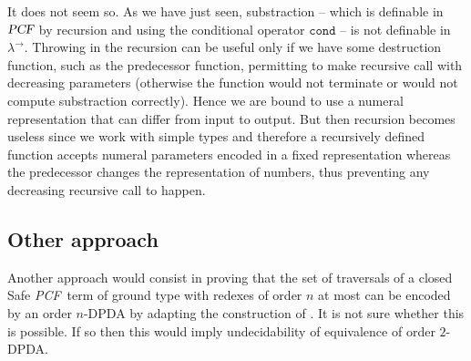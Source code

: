 \documentclass{article}
\newcommand\nat{\mathbb{N}}
\newcommand{\betared}{\rightarrow_\beta}
\newcommand{\encode}[1]{\ulcorner #1 \urcorner}
\newcommand\pcf{\textsl{PCF}}
\newcommand\pcfcond{\texttt{cond}}
\begin{document}
It does not seem so. As we have just seen, substraction -- which is definable in $\pcf$  by recursion and using the conditional operator $\pcfcond$ -- is not definable in $\lambda^\rightarrow$. Throwing in the recursion
can  be useful only if we have some destruction function, such as the predecessor function, permitting to make recursive call with decreasing parameters (otherwise the function would not terminate or would not compute substraction correctly). Hence we are bound to use a numeral representation
that can differ from input to output. But then recursion becomes useless since we work with simple types and therefore a recursively defined function accepts numeral parameters encoded in a fixed representation whereas the predecessor changes the representation of numbers, thus preventing any decreasing recursive call to happen.

%
%
%

\subsection{Other approach}

Another approach would consist in proving that the set of traversals of a closed Safe \pcf\ term of ground type with redexes of order $n$ at most can be encoded by an order $n$-DPDA by adapting the construction of \cite{KNU02}. It is not sure whether this is possible. If so then this would imply undecidability of equivalence of order $2$-DPDA.







\end{document}
